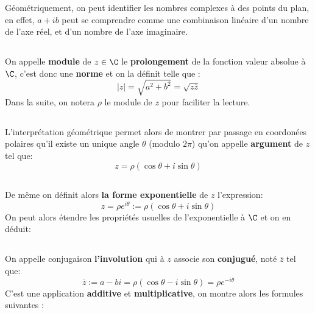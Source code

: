 Géométriquement, on peut identifier les nombres complexes à des points du plan, en effet, \(a + ib\) peut se comprendre comme une combinaison linéaire d'un nombre de l'axe réel, et d'un nombre de l'axe imaginaire.

\subsection*{}
On appelle \textbf{module} de \(z \in \C\) le \textbf{prolongement} de la fonction valeur absolue à \(\C\), c'est donc une \textbf{norme} et on la définit telle que {:}
\[
   |z| = \sqrt{a^2 + b^2} = \sqrt{z\overline{z}} 
\]
Dans la suite, on notera \(\rho\) le module de \(z\) pour faciliter la lecture.

\subsection*{}
L'interprétation géométrique permet alors de montrer par passage en coordonées polaires qu'il existe un unique angle \(\theta\) (modulo \(2\pi\)) qu'on appelle \textbf{argument} de \(z\) tel que:
\[
    z = \rho(\cos\theta+i\sin\theta)   
\]

\subsection*{}
De même on définit alors \textbf{la forme exponentielle} de \(z\) l'expression:
\[
    z = \rho e^{i\theta} := \rho(\cos\theta+i\sin\theta)
\]
On peut alors étendre les propriétés usuelles de l'exponentielle à \(\C\) et on en déduit:

\subsection*{}
On appelle conjugaison \textbf{l'involution} qui à \(z\) associe son \textbf{conjugué}, noté \(\overline{z}\) tel que:
\[
    \overline{z} := a - bi = \rho(\cos\theta - i\sin\theta) = \rho e^{-i\theta}
\]
C'est une application \textbf{additive} et \textbf{multiplicative}, on montre alors les formules suivantes {:}


